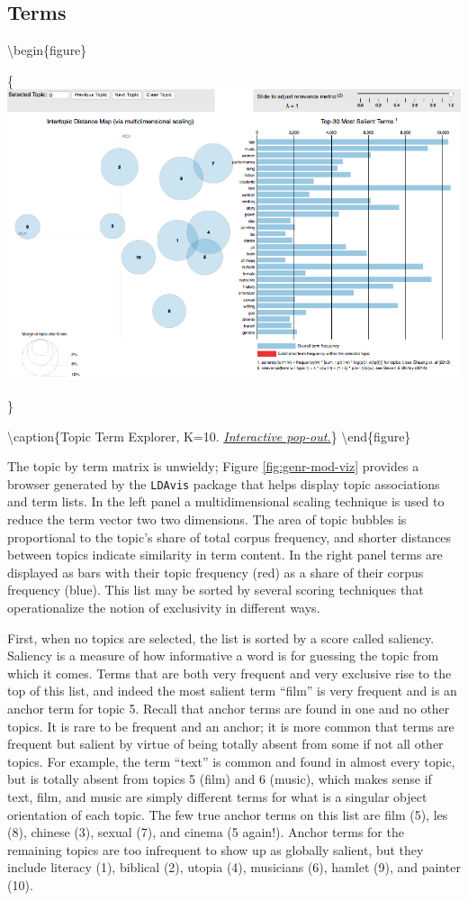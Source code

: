 \documentclass[]{book}
\theoremstyle{definition}
\theoremstyle{definition}
\theoremstyle{definition}
\theoremstyle{remark}
\begin{document}
\hypertarget{terms}{%
\subsection{Terms}\label{terms}}

\textbackslash begin\{figure\}

\{\centering \includegraphics[width=0.9\linewidth]{img/genr-mod-viz}

\}

\textbackslash caption\{Topic Term Explorer, K=10.
\href{ldaviz/viz/index.html\#topic=6\&lambda=0.5\&term=}{\emph{Interactive
pop-out.}}\}\label{fig:genr-mod-viz} \textbackslash end\{figure\}

The topic by term matrix is unwieldy; Figure \ref{fig:genr-mod-viz}
provides a browser generated by the \texttt{LDAvis} package that helps
display topic associations and term lists. In the left panel a
multidimensional scaling technique is used to reduce the term vector two
two dimensions. The area of topic bubbles is proportional to the topic's
share of total corpus frequency, and shorter distances between topics
indicate similarity in term content. In the right panel terms are
displayed as bars with their topic frequency (red) as a share of their
corpus frequency (blue). This list may be sorted by several scoring
techniques that operationalize the notion of exclusivity in different
ways.

First, when no topics are selected, the list is sorted by a score called
saliency. Saliency is a measure of how informative a word is for
guessing the topic from which it comes. Terms that are both very
frequent and very exclusive rise to the top of this list, and indeed the
most salient term ``film'' is very frequent and is an anchor term for
topic 5. Recall that anchor terms are found in one and no other topics.
It is rare to be frequent and an anchor; it is more common that terms
are frequent but salient by virtue of being totally absent from some if
not all other topics. For example, the term ``text'' is common and found
in almost every topic, but is totally absent from topics 5 (film) and 6
(music), which makes sense if text, film, and music are simply different
terms for what is a singular object orientation of each topic. The few
true anchor terms on this list are film (5), les (8), chinese (3),
sexual (7), and cinema (5 again!). Anchor terms for the remaining topics
are too infrequent to show up as globally salient, but they include
literacy (1), biblical (2), utopia (4), musicians (6), hamlet (9), and
painter (10).
\end{document}
